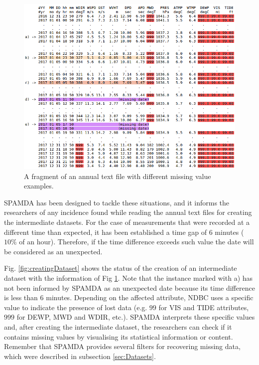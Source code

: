 \documentclass[review]{elsarticle}
\begin{document}
		\begin{figure}[ht!]
			\centering
			\includegraphics[scale=0.45]{figures/FigureMeasurements.png}
			\caption{A fragment of an annual text file with different missing value examples.}
			\label{fig:measurements}
		\end{figure}
		
		SPAMDA has been designed to tackle these situations, and it informs the researchers of any incidence found while reading the annual text files for creating the intermediate datasets. For the case of measurements that were recorded at a different time than expected, it has been established a time gap of 6 minutes ($10\%$ of an hour). Therefore, if the time difference exceeds such value the date will be considered as an unexpected.
		
		Fig. \ref{fig:creatingDataset} shows the status of the creation of an intermediate dataset with the information of Fig \ref{fig:measurements}. Note that the instance marked with a) has not been informed by SPAMDA as an unexpected date because its time difference is less than $6$ minutes. Depending on the affected attribute, NDBC uses a specific value \cite{NOAA_3} to indicate the presence of lost data (e.g. $99$ for VIS and TIDE attributes, $999$ for DEWP, MWD and WDIR, etc.). SPAMDA interprets these specific values and, after creating the intermediate dataset, the researchers can check if it contains missing values by visualising its statistical information or content. Remember that SPAMDA provides several filters for recovering missing data, which were described in subsection \ref{sec:Datasets}.
		
\end{document}
